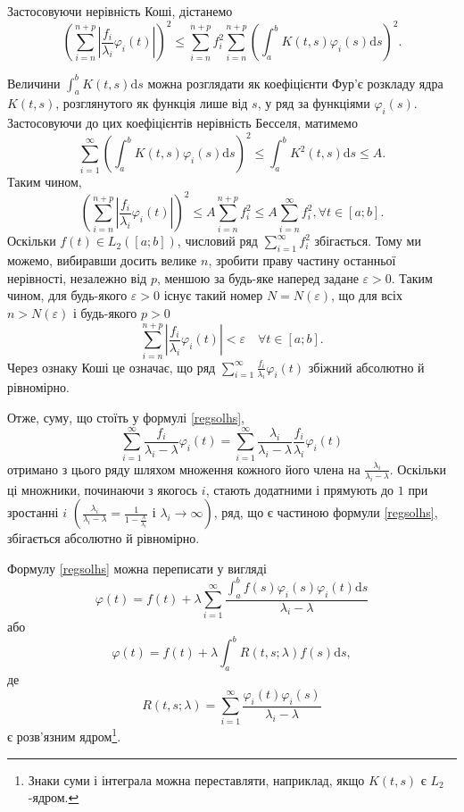 \documentclass[14pt,twoside]{extreport}
\theoremstyle{mystyle}
\numberwithin{equation}{chapter}
\begin{document}
Застосовуючи нерівність Коші, дістанемо
\[
 \left(\sum_{i=n}^{n+p} \left|\frac{f_i}{\lambda_i} \varphi_i(t)\right|\right)^2 \leqslant \sum_{i=n}^{n+p} f_i^2 \sum_{i=n}^{n+p} \left(\int_a^b K(t, s) \varphi_i(s) \mathrm{d} s\right)^2.
\]

Величини $\displaystyle\int_a^b K(t, s) \mathrm{d}s$ можна розглядати як коефіцієнти Фур'є розкладу ядра $K(t, s)$, розглянутого як функція лише від $s$, у ряд за функціями $\varphi_i(s)$. Застосовуючи до цих коефіцієнтів нерівність Бесселя, матимемо
\[
 \sum_{i=1}^{\infty} \left(\int_a^b K(t, s) \varphi_i(s) \mathrm{d} s\right)^2 \leqslant \int_a^b K^2(t, s) \mathrm{d}s \leqslant A.
\]
Таким чином,
\[
 \left(\sum_{i=n}^{n+p} \left|\frac{f_i}{\lambda_i} \varphi_i(t)\right|\right)^2 \leqslant A \sum_{i=n}^{n+p} f_i^2 \leqslant A \sum_{i=n}^{\infty} f_i^2, \forall t \in [a; b].
\]
Оскільки $f(t) \in L_2([a; b])$, числовий ряд $\sum\limits_{i=1}^{\infty} f_i^2$ збігається. Тому ми можемо, вибиравши досить велике $n$, зробити праву частину останньої нерівності, незалежно від $p$, меншою за будь-яке наперед задане $\varepsilon > 0$. Таким чином, для будь-якого $\varepsilon > 0$ існує такий номер $N=N(\varepsilon)$, що для всіх $n > N(\varepsilon)$ і будь-якого $p > 0$
\[
 \sum_{i=n}^{n+p} \left|\frac{f_i}{\lambda_i}\varphi_i(t)\right| <\varepsilon \quad\forall t \in [a; b].
\]
Через ознаку Коші це означає, що ряд $\sum\limits_{i=1}^{\infty} \frac{f_i}{\lambda_i}\varphi_i(t)$ збіжний абсолютно й рівномірно.

Отже, суму, що стоїть у формулі \eqref{regsolhs},
\[
 \sum_{i=1}^{\infty} \frac{f_i}{\lambda_i - \lambda} \varphi_i(t)= \sum_{i=1}^{\infty} \frac{\lambda_i}{\lambda_i - \lambda} \frac{f_i}{\lambda_i}\varphi_i(t)
\]
отримано з цього ряду шляхом множення кожного його члена на $\frac{\lambda_i}{\lambda_i - \lambda}$. Оскільки ці множники, починаючи з якогось $i$, стають додатними і прямують до $1$ при зростанні $i$ $\left(\frac{\lambda_i}{\lambda_i-\lambda}=\frac{1}{1- \frac{\lambda}{\lambda_i}}\textrm{ і }\lambda_i \to \infty\right)$, ряд, що є частиною формули \eqref{regsolhs}, збігається абсолютно й рівномірно.

Формулу \eqref{regsolhs} можна переписати у вигляді
\[
 \varphi(t) = f(t) + \lambda \sum_{i=1}^{\infty} \dfrac{\int_a^bf(s) \varphi_i(s) \varphi_i(t) \mathrm{d}s}{\lambda_i - \lambda}
\]
або
\[
 \varphi(t) = f(t) + \lambda \int_a^b R(t, s; \lambda) f(s) \mathrm{d}s,
\]
де
\[
 R(t, s; \lambda) = \sum_{i=1}^{\infty} \dfrac{\varphi_i(t) \varphi_i(s)}{\lambda_i - \lambda}
\]
є розв'язним ядром\footnote{Знаки суми і інтеграла можна переставляти, наприклад, якщо $K(t, s)$ є $L_2$-ядром.}.
\end{document}
